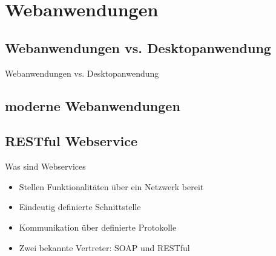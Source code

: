 \section{Webanwendungen}


\subsection{Webanwendungen vs. Desktopanwendung}

\begin{frame}{Webanwendungen vs. Desktopanwendung}
  \begin{center}
    
  \end{center}
\end{frame}

\subsection{moderne Webanwendungen}


\subsection{RESTful Webservice}

\begin{frame}{Was sind Webservices}
  \begin{itemize}
    \item Stellen Funktionalitäten über ein Netzwerk bereit
    \item Eindeutig definierte Schnittstelle
    \item Kommunikation über definierte Protokolle
    \item Zwei bekannte Vertreter: SOAP und RESTful
  \end{itemize}
\end{frame}

